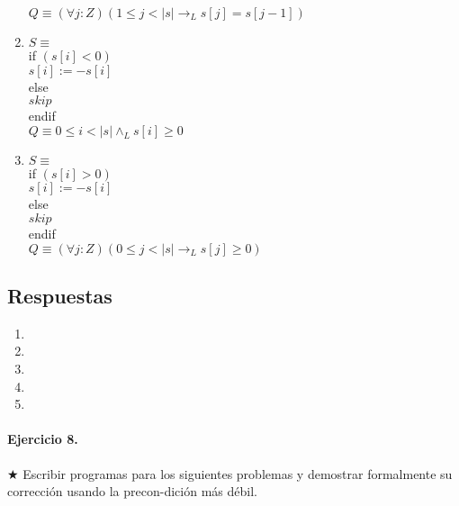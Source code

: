 \documentclass{article}
\begin{document}
\begin{enumerate}[label=\alph*)]
   $Q \equiv (\forall j :Z)(1 \leq j < |s| \rightarrow_L s[j] = s[j - 1])$\\

\item $S \equiv$\\
   if $( s [ i ] < 0 )$\\
     $ s [ i ] := -s [ i ]$\\
   else\\
      $skip$\\
   endif\\

   $Q \equiv 0 \leq i < |s| \wedge_L s[i] \geq 0$\\
\item $S \equiv$\\
   if $( s [ i ] > 0 )$\\
      $s [ i ] := -s [ i ]$\\
   else\\
      $skip$\\
   endif\\

   $Q \equiv (\forall j :Z)(0 \leq j < |s| \rightarrow_L s[j] \geq 0)$
\end{enumerate}

\subsection*{Respuestas}

\begin{enumerate}[label=\alph*)]
	\item
	\item
	\item
	\item
	\item
\end{enumerate}
                                                          
\paragraph{Ejercicio 8.} $\bigstar$ Escribir programas para los siguientes problemas y demostrar 
formalmente su corrección usando la precon-dición más débil.
\end{document}
